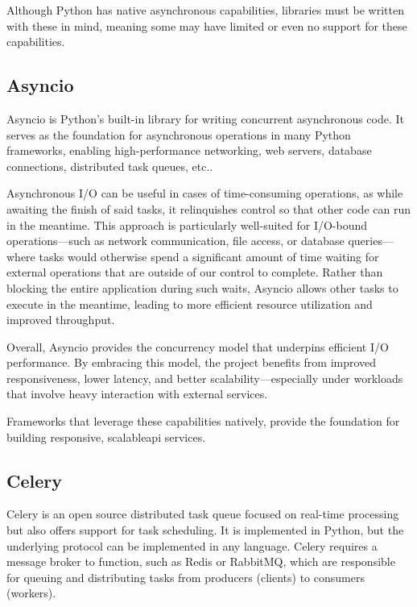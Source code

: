     Although Python has native asynchronous capabilities, libraries must be written with these in mind, meaning some may have limited 
    or even no support for these capabilities.
    
  \subsection{Asyncio}

    Asyncio is Python's built-in library for writing concurrent asynchronous code. It serves as the foundation for asynchronous operations 
    in many Python frameworks, enabling high-performance networking, web servers, database connections, distributed task queues, etc.. 

    Asynchronous I/O can be useful in cases of time-consuming operations, as while awaiting the finish of said tasks, it relinquishes control 
    so that other code can run in the meantime. This approach is particularly well-suited for I/O-bound operations—such as network 
    communication, file access, or database queries—where tasks would otherwise spend a significant amount of time waiting for external operations that 
    are outside of our control to complete. Rather than blocking the entire application during such waits, Asyncio allows other tasks to 
    execute in the meantime, leading to more efficient resource utilization and improved throughput.

    Overall, Asyncio provides the concurrency model that underpins efficient I/O performance. By embracing this model, 
    the project benefits from improved responsiveness, lower latency, and better scalability—especially under workloads that 
    involve heavy interaction with external services.

    Frameworks that leverage these capabilities natively, provide the foundation for building responsive, scalable\ac{api} 
    services.
    
  \subsection{Celery}
    Celery is an open source distributed task queue focused on real-time processing but also offers support for task scheduling.
    It is implemented in Python, but the underlying protocol can be implemented in any language. Celery requires a message broker 
    to function, such as Redis or RabbitMQ, which are responsible for queuing and distributing tasks from producers (clients) to 
    consumers (workers).

